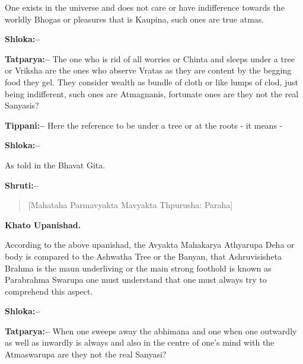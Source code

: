 One exists in the universe and does not care or have indifference towards the worldly Bhogas or pleasures that is Kaupina, such ones are true atmas.

\textbf{Shloka:–}

\begin{verse}
  
\end{verse}

\textbf{Tatparya:–} The one who is rid of all worries or Chinta and sleeps under a tree or Vriksha are the ones who abserve Vratas as they are content by the begging food they gel. They consider wealth as bundle of cloth or like lumps of clod, just being indifferent, such ones are Atmagnanis, fortunate ones are they not the real Sanyasis?

\textbf{Tippani:–} Here the reference to be under a tree or at the roots - it means -

\textbf{Shloka:–}

\begin{verse}
\dev{[॥ ऊदवरामूला मधाश्याख मश्वीथम प्राहु रव्यम~॥.]}
\end{verse}

As told in the Bhavat Gita.

\textbf{Shruti:–}

\begin{verse}
[Mahataha Parmavyakta Mavyakta Thpurusha: Paraha]
\end{verse}

\begin{flushright}
\textbf{Khato Upanishad.}
\end{flushright}

According to the above upanishad, the Avyakta Mahakarya Athyarupa Deha or body is compared to the Ashwatha Tree or the Banyan, that Ashruvisisheta Brahma is the maun underliving or the main strong foothold is known as Parabrahma Swarupa one must understand that one must always try to comprehend this aspect.

\textbf{Shloka:–}

\begin{verse}
  
\end{verse}

\textbf{Tatparya:–} When one sweeps away the abhimana and one when one outwardly as well as inwardly is always and also in the centre of one's mind with the Atmaswarupa are they not the real Sanyasi?

